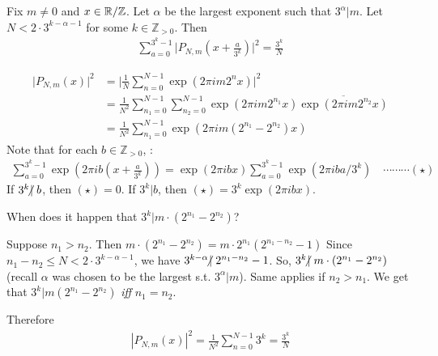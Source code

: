 \documentclass[12pt,a4paper]{report}
\newenvironment{proof}
{\begin{changemargin}{1cm}{0.5cm} 
	}%
	{\end{changemargin}
}
\newenvironment{subproof}
{\begin{changemargin}{0.5cm}{0.5cm}
	}%
	{\end{changemargin}
}
\begin{document}
\lem Fix $m\neq 0$ and $x\in \mathbb{R}/\mathbb{Z}$. Let $\alpha$ be the largest exponent such that $3^{\alpha} | m$. Let $N < 2\cdot 3^{k-\alpha -1}$ for some $k\in \mathbb{Z}_{>0}$. Then
\begin{align*}
\sum_{a=0}^{3^{k}-1} \big| P_{N,m}(x + \frac{a}{3^k}) \big|^2 = \frac{3^k}{N}
\end{align*}
\begin{proof}
\pf \begin{align*}
\big| P_{N,m}(x) \big|^2 &= \big| \frac{1}{N} \sum_{n=0}^{N-1} \exp(2\pi i m 2^n x) \big|^2 \\
&= \frac{1}{N^2} \sum_{n_1=0}^{N-1} \sum_{n_2=0}^{N-1} \exp(2\pi im2^{n_1} x) \overline{\exp(2\pi im2^{n_2} x)} \\
&= \frac{1}{N^2} \sum_{n_1=0}^{N-1} \exp(2\pi i m(2^{n_1} - 2^{n_2}) x)
\end{align*}
Note that for each $b\in \mathbb{Z}_{>0}$, :
\begin{align*}
\sum_{a=0}^{3^k-1} \exp(2\pi ib(x+ \frac{a}{3^k})) = \exp(2\pi i bx) \sum_{a=0}^{3^k -1} \exp(2\pi iba/3^k) \quad \cdots \cdots\cdots (\star)
\end{align*}
If $3^k \hspace{-5pt}\not|\hspace{3pt} b$, then $(\star)=0$. If $3^k | b$, then $(\star) = 3^k \exp(2\pi ibx)$.
\s

When does it happen that $3^k | m \cdot (2^{n_1} - 2^{n_2})$?
\begin{subproof}
Suppose $n_1>n_2$. Then $m\cdot (2^{n_1} - 2^{n_2}) = m\cdot 2^{n_1}(2^{n_1 - n_2} -1)$ Since $n_1-n_2 \leq N < 2\cdot 3^{k - \alpha -1}$, we have $3^{k-\alpha} \hspace{-5pt}\not|\hspace{3pt} 2^{n_1-n_2} - 1$. So, $3^k \hspace{-5pt}\not|\hspace{3pt} m\cdot (2^{n_1} - 2^{n_2})$ (recall $\alpha$ was chosen to be the largest s.t. $3^{\alpha} | m$). Same applies if $n_2 >n_1$. We get that $3^k | m(2^{n_1}-2^{n_2})$ \emph{iff} $n_1 =n_2$.
\end{subproof}
Therefore
\begin{align*}
|P_{N,m}(x)|^2 = \frac{1}{N^2} \sum_{n=0}^{N-1} 3^k = \frac{3^k}{N} 
\end{align*}

\eop
\end{proof}
\end{document}
